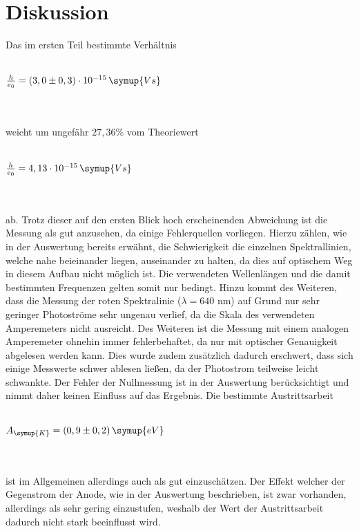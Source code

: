 \section{Diskussion}
\label{sec:Diskussion}
Das im ersten Teil bestimmte Verhältnis 
\\ \\
\centerline{$ \frac{h}{e_0} = (3,0 \pm 0,3) \cdot 10^{-15} \, \symup{Vs} $}
\\ \\
weicht um ungefähr $27,36\%$ vom Theoriewert
\\ \\
\centerline{$ \frac{h}{e_0} = 4,13 \cdot 10^{-15} \, \symup{Vs} $}
\\ \\
ab. Trotz dieser auf den ersten Blick hoch erscheinenden Abweichung ist die Messung als gut anzusehen, da einige Fehlerquellen vorliegen.
Hierzu zählen, wie in der Auswertung bereits erwähnt, die Schwierigkeit die einzelnen Spektrallinien, welche nahe beieinander 
liegen, auseinander zu halten, da dies auf optischem Weg in diesem Aufbau nicht möglich ist. Die verwendeten Wellenlängen und die damit
bestimmten Frequenzen gelten somit nur bedingt. Hinzu kommt des Weiteren, dass die Messung der roten Spektralinie ($\lambda = 640$ nm) auf 
Grund nur sehr geringer Photoströme sehr ungenau verlief, da die Skala des verwendeten Amperemeters nicht ausreicht. Des Weiteren ist die 
Messung mit einem analogen Amperemeter ohnehin immer fehlerbehaftet, da nur mit optischer Genauigkeit abgelesen werden kann. Dies wurde zudem
zusätzlich dadurch erschwert, dass sich einige Messwerte schwer ablesen ließen, da der Photostrom teilweise leicht schwankte.
Der Fehler der Nullmessung ist in der Auswertung berücksichtigt und nimmt daher keinen Einfluss auf das Ergebnis.
Die bestimmte Austrittsarbeit
\\ \\
\centerline{$A_{\symup{K}} = (0,9 \pm 0,2) \, \symup{eV}$}
\\ \\
ist im Allgemeinen allerdings auch als gut einzuschätzen. Der Effekt welcher der Gegenstrom der Anode, wie in der Auswertung beschrieben, ist zwar 
vorhanden, allerdings als sehr gering einzustufen, weshalb der Wert der Austrittsarbeit dadurch nicht stark beeinflusst wird.